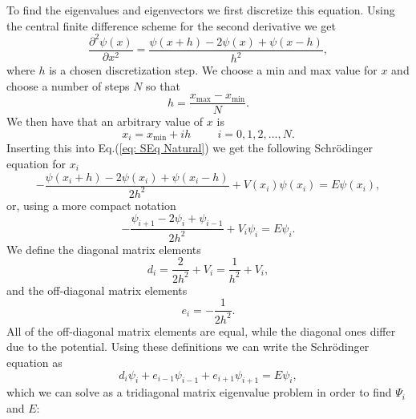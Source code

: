 \documentclass[../main.tex]{subfiles}
\begin{document}
To find the eigenvalues and eigenvectors we first discretize this equation. Using the central finite difference scheme for the second derivative we get
\begin{equation}
    \frac{\partial^2\psi(x)}{\partial x^2} = \frac{\psi(x+h) - 2\psi(x) + \psi(x-h)}{h^2},
\end{equation}
where $h$ is a chosen discretization step. We choose a min and max value for $x$ and choose a number of steps $N$ so that \begin{equation}
    h = \frac{x_{\mathrm{max}}-x_{\mathrm{min}}}{N}.
\end{equation}
We then have that an arbitrary value of $x$ is 
\begin{equation}
    x_i = x_{\mathrm{min}} + ih \hspace{1cm} i = 0,1,2,\dots,N.
\end{equation}
Inserting this into Eq.(\ref{eq: SEq Natural}) we get the following Schr\"odinger equation for $x_i$
\begin{equation}
    -\frac{\psi(x_i+h) - 2\psi(x_i) + \psi(x_i-h)}{2h^2} + V(x_i)\psi(x_i) = E\psi(x_i),
\end{equation}
or, using a more compact notation
\begin{equation}
    -\frac{\psi_{i+1} - 2\psi_i + \psi_{i-1}}{2h^2} + V_i\psi_i = E\psi_i.
\end{equation}
We define the diagonal matrix elements
\begin{equation}
    d_i = \frac{2}{2h^2} + V_i = \frac{1}{h^2} + V_i,
\end{equation}
and the off-diagonal matrix elements
\begin{equation}
    e_i = -\frac{1}{2h^2}.
\end{equation}
All of the off-diagonal matrix elements are equal, while the diagonal ones differ due to the potential. Using these definitions we can write the Schr\"odinger equation as
\begin{equation}
    d_i\psi_i + e_{i-1}\psi_{i-1} + e_{i+1}\psi_{i+1} = E\psi_i,
\end{equation}
which we can solve as a tridiagonal matrix eigenvalue problem in order to find $\Psi_i$ and $E$:
\end{document}
